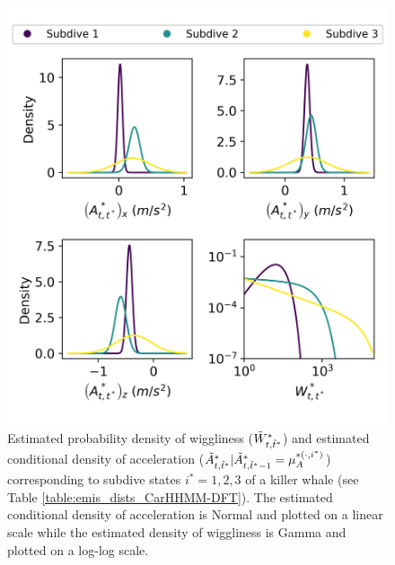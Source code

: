 \begin{figure}[ht]
	\centering
	\includegraphics[width=5in]{../Plots/CarHHMM2-fine-emissions.png}
	\caption{Estimated probability density of wiggliness ($\tilde{W}^*_{t,\tilde t^*}$) and estimated conditional density of acceleration ($\tilde{A}^*_{t,\tilde t^*}|\tilde{A}^*_{t,\tilde t^*-1} = \mu_A^{*(\cdot,i^*)}$) corresponding to subdive states $i^* = 1,2,3$ of a killer whale (see Table \ref{table:emis_dists_CarHHMM-DFT}). The estimated conditional density of acceleration is Normal and plotted on a linear scale while the estimated density of wiggliness is Gamma and plotted on a log-log scale.}
	\label{fig:fine_emis}
\end{figure}

